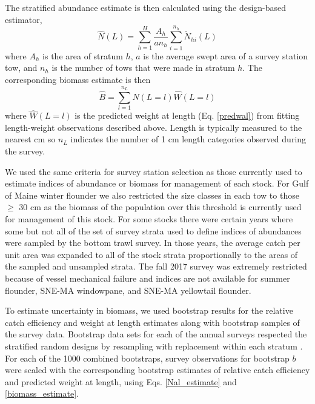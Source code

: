 \documentclass[
  12pt,
]{article}
\begin{document}
The stratified abundance estimate is then calculated using the
design-based estimator, \begin{equation}\label{Nal_estimate}
 \widehat N(L) = \sum^H_{h=1} \frac{A_h}{an_h}\sum^{n_h}_{i=1} \widetilde N_{hi}(L)
\end{equation} where \(A_h\) is the area of stratum \(h\), \(a\) is the
average swept area of a survey station tow, and \(n_h\) is the number of
tows that were made in stratum \(h\). The corresponding biomass estimate
is then \begin{equation}\label{biomass_estimate}
 \widehat B = \sum^{n_L}_{l=1} \widehat N(L = l) \widehat W(L=l)
\end{equation} where \(\widehat W(L=l)\) is the predicted weight at
length (Eq. \ref{predwal}) from fitting length-weight observations
described above. Length is typically measured to the nearest cm so
\(n_L\) indicates the number of 1 cm length categories observed during
the survey.

We used the same criteria for survey station selection as those
currently used to estimate indices of abundance or biomass for
management of each stock. For Gulf of Maine winter flounder we also
restricted the size classes in each tow to those \(\geq\) 30 cm as the
biomass of the population over this threshold is currently used for
management of this stock. For some stocks there were certain years where
some but not all of the set of survey strata used to define indices of
abundances were sampled by the bottom trawl survey. In those years, the
average catch per unit area was expanded to all of the stock strata
proportionally to the areas of the sampled and unsampled strata. The
fall 2017 survey was extremely restricted because of vessel mechanical
failure and indices are not available for summer flounder, SNE-MA
windowpane, and SNE-MA yellowtail flounder.

To estimate uncertainty in biomass, we used bootstrap results for the
relative catch efficiency and weight at length estimates along with
bootstrap samples of the survey data. Bootstrap data sets for each of
the annual surveys respected the stratified random designs by resampling
with replacement within each stratum \citep{smith97}. For each of the
1000 combined bootstraps, survey observations for bootstrap \(b\) were
scaled with the corresponding bootstrap estimates of relative catch
efficiency and predicted weight at length, using Eqs. \ref{Nal_estimate}
and \ref{biomass_estimate}.
\end{document}
